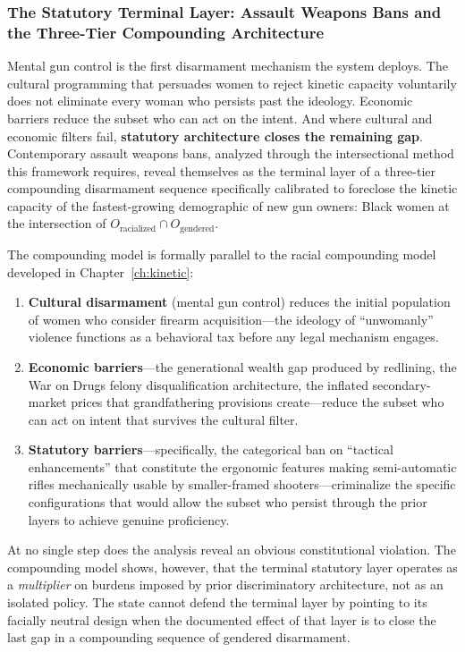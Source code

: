 \subsubsection{The Statutory Terminal Layer: Assault Weapons Bans and the Three-Tier Compounding Architecture}
\label{subsubsec:awb_gendered}

Mental gun control is the first disarmament mechanism the system deploys. The cultural programming that persuades women to reject kinetic capacity voluntarily does not eliminate every woman who persists past the ideology. Economic barriers reduce the subset who can act on the intent. And where cultural and economic filters fail, \textbf{statutory architecture closes the remaining gap}. Contemporary assault weapons bans, analyzed through the intersectional method this framework requires, reveal themselves as the terminal layer of a three-tier compounding disarmament sequence specifically calibrated to foreclose the kinetic capacity of the fastest-growing demographic of new gun owners: Black women at the intersection of $O_{\text{racialized}} \cap O_{\text{gendered}}$.

The compounding model is formally parallel to the racial compounding model developed in Chapter~\ref{ch:kinetic}:

\begin{enumerate}
    \item \textbf{Cultural disarmament} (mental gun control) reduces the initial population of women who consider firearm acquisition---the ideology of ``unwomanly'' violence functions as a behavioral tax before any legal mechanism engages.
    \item \textbf{Economic barriers}---the generational wealth gap produced by redlining, the War on Drugs felony disqualification architecture, the inflated secondary-market prices that grandfathering provisions create---reduce the subset who can act on intent that survives the cultural filter.
    \item \textbf{Statutory barriers}---specifically, the categorical ban on ``tactical enhancements'' that constitute the ergonomic features making semi-automatic rifles mechanically usable by smaller-framed shooters---criminalize the specific configurations that would allow the subset who persist through the prior layers to achieve genuine proficiency.
\end{enumerate}

At no single step does the analysis reveal an obvious constitutional violation. The compounding model shows, however, that the terminal statutory layer operates as a \textit{multiplier} on burdens imposed by prior discriminatory architecture, not as an isolated policy. The state cannot defend the terminal layer by pointing to its facially neutral design when the documented effect of that layer is to close the last gap in a compounding sequence of gendered disarmament.

